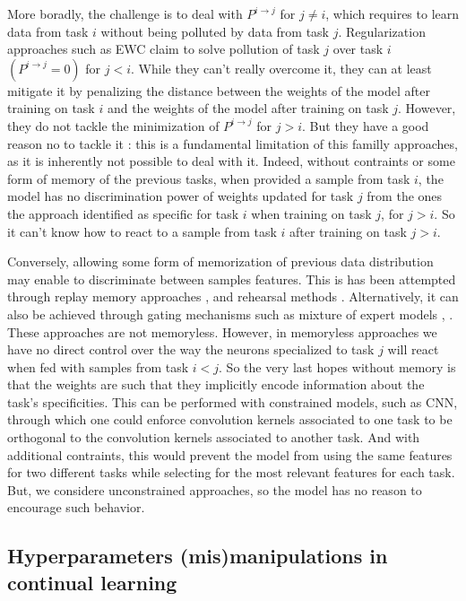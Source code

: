 \documentclass[11pt]{article}
\begin{document}
\vspace{1mm}
\noindent
More boradly, the challenge is to deal with $P^{i\rightarrow j}$ for $j \neq i$, which requires to learn data from task $i$ without being polluted by data from task $j$. Regularization approaches such as EWC claim to solve pollution of task $j$ over task $i$ $(P^{i\rightarrow j}=0)$ for $j<i$. While they can't really overcome it, they can at least mitigate it by penalizing the distance between the weights of the model after training on task $i$ and the weights of the model after training on task $j$. However, they do not tackle the minimization of $P^{i\rightarrow j}$ for $j>i$. But they have a good reason no to tackle it : this is a fundamental limitation of this familly approaches, as it is inherently not possible to deal with it. Indeed, without contraints or some form of memory of the previous tasks, when provided a sample from task $i$, the model has no discrimination power of weights updated for task $j$ from the ones the approach identified as specific for task $i$ when training on task $j$, for $j>i$. So it can't know how to react to a sample from task $i$ after training on task $j>i$.

\vspace{1mm}
\noindent
Conversely, allowing some form of memorization of previous data distribution may enable to discriminate between samples features. This is has been attempted through replay memory approaches \cite{replay1}, \cite{replay2} and rehearsal methods \cite{rehearsal}. Alternatively, it can also be achieved through gating mechanisms such as mixture of expert models \cite{moe}, \cite{dmoe}. These approaches are not memoryless. However, in memoryless approaches we have no direct control over the way the neurons specialized to task $j$ will react when fed with samples from task $i<j$. So the very last hopes without memory is that the weights are such that they implicitly encode information about the task's specificities. This can be performed with constrained models, such as CNN, through which one could enforce convolution kernels associated to one task to be orthogonal to the convolution kernels associated to another task. And with additional contraints, this would prevent the model from using the same features for two different tasks while selecting for the most relevant features for each task. But, we considere unconstrained approaches, so the model has no reason to encourage such behavior.


\subsection{Hyperparameters (mis)manipulations in continual learning}
\end{document}
